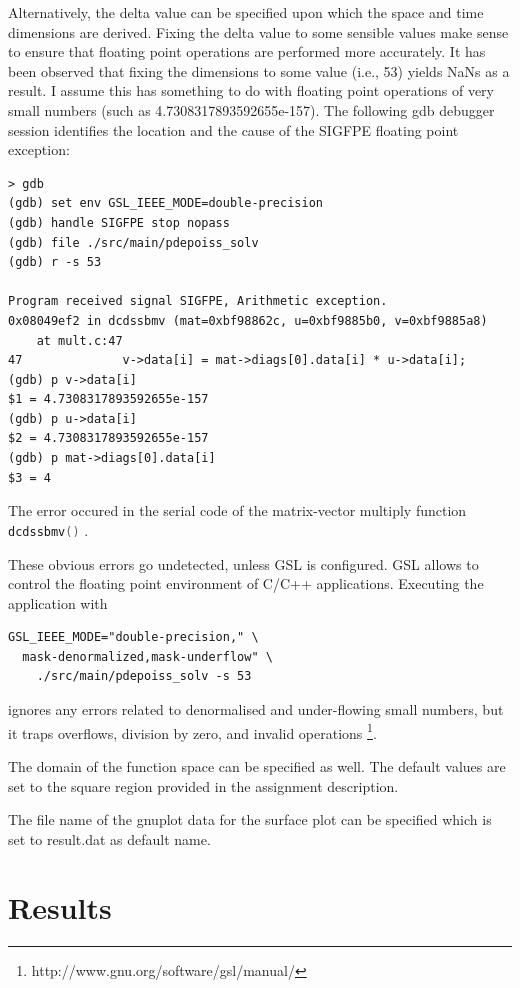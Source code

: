 \documentclass[12pt,a4paper]{report}
\def\ccode#1{
  \lstinline[basicstyle=\ttfamily,language=C]{#1} }
\begin{document}
Alternatively, the delta value can be specified upon which the space
and time dimensions are derived. Fixing the delta value to some
sensible values make sense to ensure that floating point operations
are performed more accurately. It has been observed that fixing the
dimensions to some value (i.e., 53) yields NaNs as a result. I assume
this has something to do with floating point operations of very small
numbers (such as 4.7308317893592655e-157). The following gdb debugger
session identifies the location and the cause of the SIGFPE floating
point exception:

\begin{verbatim}
> gdb
(gdb) set env GSL_IEEE_MODE=double-precision
(gdb) handle SIGFPE stop nopass
(gdb) file ./src/main/pdepoiss_solv
(gdb) r -s 53

Program received signal SIGFPE, Arithmetic exception.
0x08049ef2 in dcdssbmv (mat=0xbf98862c, u=0xbf9885b0, v=0xbf9885a8)
    at mult.c:47
47              v->data[i] = mat->diags[0].data[i] * u->data[i];
(gdb) p v->data[i]
$1 = 4.7308317893592655e-157
(gdb) p u->data[i]
$2 = 4.7308317893592655e-157
(gdb) p mat->diags[0].data[i]
$3 = 4
\end{verbatim}

The error occured in the serial code of the matrix-vector multiply
function \ccode{dcdssbmv()}.

These obvious errors go undetected, unless GSL is configured. GSL
allows to control the floating point environment of C/C++
applications. Executing the application with

\begin{verbatim}
GSL_IEEE_MODE="double-precision," \
  mask-denormalized,mask-underflow" \
    ./src/main/pdepoiss_solv -s 53
\end{verbatim}

ignores any errors related to denormalised and under-flowing small
numbers, but it traps overflows, division by zero, and invalid
operations \footnote{http://www.gnu.org/software/gsl/manual/}.

The domain of the function space can be specified as well. The default
values are set to the square region provided in the assignment
description.

The file name of the gnuplot data for the surface plot can be
specified which is set to result.dat as default name.

\chapter{Results}
\label{cha:results}
\end{document}
